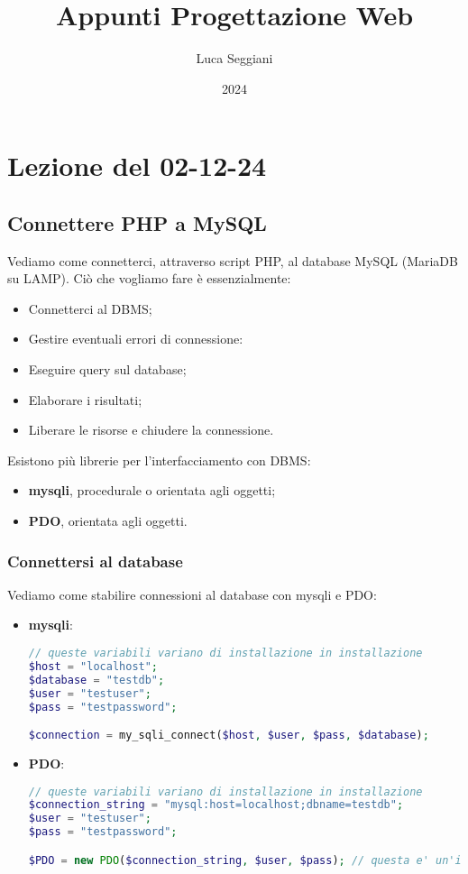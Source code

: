 \documentclass[a4paper,11pt]{article}
\title{Appunti Progettazione Web}
\author{Luca Seggiani}
\date{2024}
\begin{document}
\section{Lezione del 02-12-24}

\thispagestyle{empty}
\pagestyle{fancy}

\lstset{style=codestyle, language=php}

\subsection{Connettere PHP a MySQL}
Vediamo come connetterci, attraverso script PHP, al database MySQL (MariaDB su LAMP). 
Ciò che vogliamo fare è essenzialmente:
\begin{itemize}
	\item Connetterci al DBMS;
	\item Gestire eventuali errori di connessione:
	\item Eseguire query sul database;
	\item Elaborare i risultati;
	\item Liberare le risorse e chiudere la connessione.
\end{itemize}

Esistono più librerie per l'interfacciamento con DBMS:
\begin{itemize}
	\item \textbf{mysqli}, procedurale o orientata agli oggetti;
	\item \textbf{PDO}, orientata agli oggetti.
\end{itemize}

\subsubsection{Connettersi al database}
Vediamo come stabilire connessioni al database con mysqli e PDO:
\begin{itemize}
	\item \textbf{mysqli}:
\begin{lstlisting}[language=php, style=codestyle]	
// queste variabili variano di installazione in installazione
$host = "localhost";
$database = "testdb";
$user = "testuser";
$pass = "testpassword";

$connection = my_sqli_connect($host, $user, $pass, $database);
\end{lstlisting}
	\item \textbf{PDO}:
\begin{lstlisting}[language=php, style=codestyle]	
// queste variabili variano di installazione in installazione
$connection_string = "mysql:host=localhost;dbname=testdb";
$user = "testuser";
$pass = "testpassword";

$PDO = new PDO($connection_string, $user, $pass); // questa e' un'istanza di classe!
\end{lstlisting}
\end{itemize}
\end{document}
